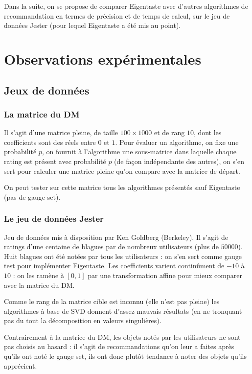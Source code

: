 \documentclass[11pt, openany, a4paper]{article}
\begin{document}
		Dans la suite, on se propose de comparer Eigentaste avec d'autres algorithmes de recommandation en termes de précision et de temps de calcul, sur le jeu de données Jester (pour lequel Eigentaste a été mis au point).
		
		
		
		
\section{Observations expérimentales}
	\subsection{Jeux de données}
	\subsubsection{La matrice du DM}
		
		Il s'agit d'une matrice pleine, de taille $100 \times 1000$ et de rang $10$, dont les coefficients sont des réels entre $0$ et $1$. Pour évaluer un algorithme, on fixe une probabilité $p$, on fournit à l'algorithme une sous-matrice dans laquelle chaque rating est présent avec probabilité $p$ (de façon indépendante des autres), on s'en sert pour calculer une matrice pleine qu'on compare avec la matrice de départ.
		
		On peut tester sur cette matrice tous les algorithmes présentés sauf Eigentaste (pas de gauge set).
		
	\subsubsection{Le jeu de données Jester}
		Jeu de données mis à disposition par Ken Goldberg (Berkeley). Il s'agit de ratings d'une centaine de blagues par de nombreux utilisateurs (plus de $50 000$). Huit blagues ont été notées par tous les utilisateurs : on s'en sert comme gauge test pour implémenter Eigentaste. Les coefficients varient continûment de $-10$ à $10$ : on les ramène à $[0,1]$ par une transformation affine pour mieux comparer avec la matrice du DM.
		
		Comme le rang de la matrice cible est inconnu (elle n'est pas pleine) les algorithmes à base de SVD donnent d'assez mauvais résultats (en ne tronquant pas du tout la décomposition en valeurs singulières).
		
		Contrairement à la matrice du DM, les objets notés par les utilisateurs ne sont pas choisis au hasard : il s'agit de recommandations qu'on leur a faites après qu'ils ont noté le gauge set, ils ont donc plutôt tendance à noter des objets qu'ils apprécient.
		
\end{document}
